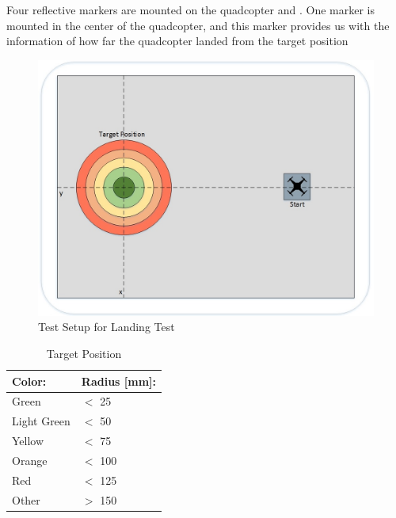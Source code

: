 Four reflective markers are mounted on the quadcopter and . One marker is mounted in the center of the quadcopter, and this marker provides us with the information of how far the quadcopter landed from the target position
\begin{figure}[H]
    \centering
    \includegraphics[width = 1\textwidth]{VAPIQ-PICTURES/landingtest}
    \caption{Test Setup for Landing Test}
    \label{fig:landsetup}
\end{figure}

\begin {table}[H]
    \begin{center}
    \caption {Target Position} 
    \label{tab:bla} 
    \begin{tabular}{|l|l|}\hline 
        \textbf{Color:}    & \textbf{Radius [mm]:} \\ \hline
        Green   &  $<$ 25 \\ \hline
        Light Green & $<$ 50 \\\hline
        Yellow & $<$ 75 \\ \hline
        Orange & $<$ 100 \\ \hline
        Red    & $<$ 125 \\ \hline
        Other  & $>$ 150 \\ \hline
        \end{tabular}
    \end{center}
\end{table}

